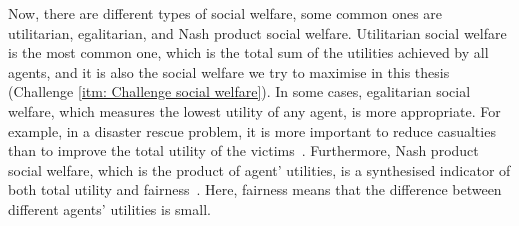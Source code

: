 \documentclass[11pt]{phdthesis}
\begin{document}
Now, there are different types of social welfare, some common ones are utilitarian, egalitarian, and Nash product social welfare. Utilitarian social welfare is the most common one, which is the total sum of the utilities achieved by all agents, and it is also the social welfare we try to maximise in this thesis (Challenge \ref{itm: Challenge social welfare}). In some cases, egalitarian social welfare, which measures the lowest utility of any agent, is more appropriate. For example, in a disaster rescue problem, it is more important to reduce casualties than to improve the total utility of the victims~\citep{roos2010complexity}. Furthermore, Nash product social welfare, which is the product of agent' utilities, is a synthesised indicator of both total utility and fairness~\citep{moulin2004fair}. Here, fairness means that the difference between different agents' utilities is small. 
\end{document}
